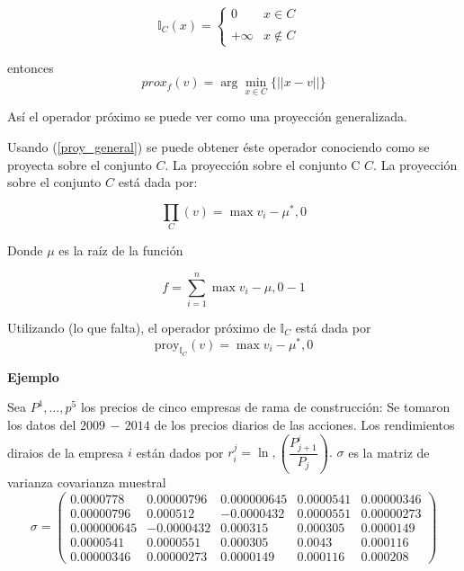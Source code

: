 \[\mathbb{I}_C (x) = \left \{ \begin{array}{rcl}
                                 0 & x \in C & \\
                                  &  &  \\
                                 +\infty  & x \notin C & 
                              \end{array}
\right. \]


entonces \begin{equation}
           prox_{f}(v) = \arg \min_{x \in C} \{|| x - v || \} 
           \label{proy_general}
         \end{equation}

As\'i el operador pr\'oximo se puede ver como una proyecci\'on generalizada.

Usando (\ref{proy_general}) se puede obtener \'este operador conociendo como se proyecta sobre el conjunto $C$.
La proyección sobre el conjunto C $C.$ La proyecci\'on sobre el conjunto $C$ est\'a dada por:

\[ \prod_{C}(v) = \max {v_i - \mu^{*}, 0} \]

Donde $\mu$ es la ra\'iz de la funci\'on

\[ f = \sum_{i = 1}^{n} \max{v_i - \mu, 0} - 1 \]

Utilizando (lo que falta), el operador pr\'oximo de $\mathbb{I}_{C}$ est\'a dada por 
$$\mbox{proy}_{\mathbb{I}_{C}}(v) = \max{v_i - \mu^{*}, 0}$$

\textbf{Ejemplo \cite{intro}}\medskip

Sea $ P^{1}, \ldots , p^{5} $ los precios de cinco empresas de rama de construcci\'on: Se tomaron los datos del $ 2009 \,- \, 2014 $ de los 
precios diarios de las acciones. Los rendimientos diraios de la empresa $i$ est\'an dados por $r_{i}^{j} = \ln,\left(\dfrac{P_{j + 1}^{i}}
{P_j}\right).$
$\sigma $ es la matriz de varianza covarianza muestral\\

$$\sigma = \begin{pmatrix}
             0.0000778 & 0.00000796 & 0.000000645 & 0.0000541 & 0.00000346 \\
             0.00000796 & 0.000512  & −0.0000432  & 0.0000551 & 0.00000273 \\
             0.000000645 & −0.0000432 & 0.000315  & 0.000305  & 0.0000149 \\
             0.0000541   & 0.0000551  & 0.000305  & 0.0043    & 0.000116\\
             0.00000346  & 0.00000273 & 0.0000149 & 0.000116  & 0.000208
          \end{pmatrix}
$$

